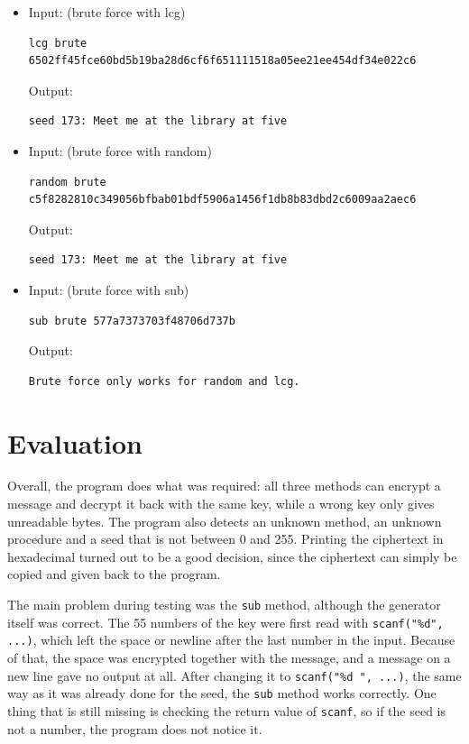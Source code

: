 \documentclass[a4paper,10pt]{article}
\begin{document}
\begin{itemize}
\item Input: (brute force with lcg)
\begin{lstlisting}[style = stdio]
lcg brute 6502ff45fce60bd5b19ba28d6cf6f651111518a05ee21ee454df34e022c6
\end{lstlisting}
 
  Output:
\begin{lstlisting}[style = stdio]
seed 173: Meet me at the library at five
\end{lstlisting}
 
\item Input: (brute force with random)
\begin{lstlisting}[style = stdio]
random brute c5f8282810c349056bfbab01bdf5906a1456f1db8b83dbd2c6009aa2aec6
\end{lstlisting}
 
  Output:
\begin{lstlisting}[style = stdio]
seed 173: Meet me at the library at five
\end{lstlisting}
 
\item Input: (brute force with sub)
\begin{lstlisting}[style = stdio]
sub brute 577a7373703f48706d737b
\end{lstlisting}
 
  Output:
\begin{lstlisting}[style = stdio]
Brute force only works for random and lcg.
\end{lstlisting}
 
\end{itemize}
 
\section{Evaluation}
Overall, the program does what was required: all three methods can encrypt a message and decrypt it back with the same key, while a wrong key only gives unreadable bytes. The program also detects an unknown method, an unknown procedure and a seed that is not between 0 and 255. Printing the ciphertext in hexadecimal turned out to be a good decision, since the ciphertext can simply be copied and given back to the program.

The main problem during testing was the {\tt sub} method, although the generator itself was correct. The 55 numbers of the key were first read with \mbox{\tt scanf("\%d", ...)}, which left the space or newline after the last number in the input. Because of that, the space was encrypted together with the message, and a message on a new line gave no output at all. After changing it to \mbox{\tt scanf("\%d ", ...)}, the same way as it was already done for the seed, the {\tt sub} method works correctly. One thing that is still missing is checking the return value of {\tt scanf}, so if the seed is not a number, the program does not notice it.
\end{document}
